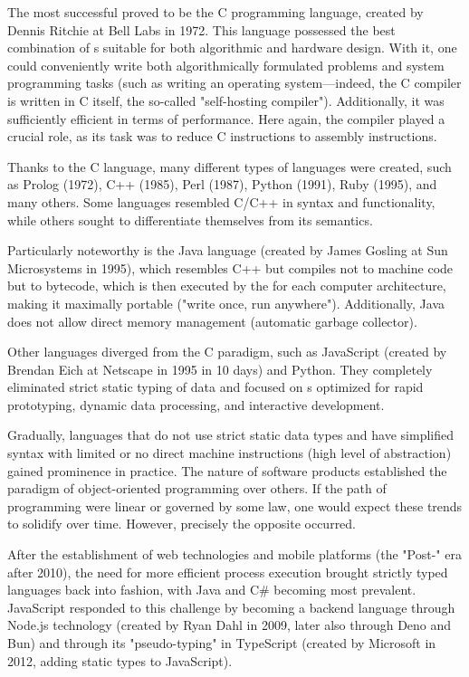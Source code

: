 The most successful proved to be
the C programming language, created by Dennis Ritchie at Bell Labs in 1972. This language possessed the best
combination of s suitable for both algorithmic and hardware design. With it, one could conveniently write both algorithmically
formulated problems and system programming tasks (such as writing an operating system—indeed, the C compiler is written in C itself, the so-called "self-hosting compiler").
Additionally, it was sufficiently efficient in terms of performance. Here again, the compiler played a crucial role,
as its task was to reduce C instructions to assembly instructions.

Thanks to the C language,
many different types of languages were created, such as Prolog (1972), C++ (1985), Perl (1987), Python (1991), Ruby (1995), and many others. Some languages resembled C/C++ in syntax
and functionality, while others sought to differentiate themselves from its semantics.

Particularly noteworthy is the Java language (created by James Gosling at Sun Microsystems in 1995),
which resembles C++ but compiles not to machine code but to bytecode, which is then executed by the  for each computer architecture, making it maximally portable ("write once, run anywhere"). Additionally, Java does not allow direct memory management (automatic garbage collector).

Other languages diverged from the C paradigm, such as JavaScript (created by Brendan Eich at Netscape in 1995 in 10 days) and Python. They completely eliminated
strict static typing of data and focused on s optimized for rapid prototyping, dynamic data processing, and interactive development.

Gradually, languages that do not use strict static data types and have simplified syntax with limited
or no direct machine instructions (high level of abstraction) gained prominence in practice. The nature of software products established the paradigm
of object-oriented programming over others. If the path of programming were linear
or governed by some law, one would expect these trends to solidify over time.
However, precisely the opposite occurred.

After the establishment of web technologies and mobile platforms (the "Post-" era after 2010), the need for more efficient process execution
brought strictly typed languages back into fashion, with Java and C\# becoming most prevalent.
JavaScript responded to this challenge by becoming a backend language through Node.js technology (created by Ryan Dahl in 2009,
later also through Deno and Bun) and through its "pseudo-typing" in TypeScript (created by Microsoft in 2012, adding static types to JavaScript).

